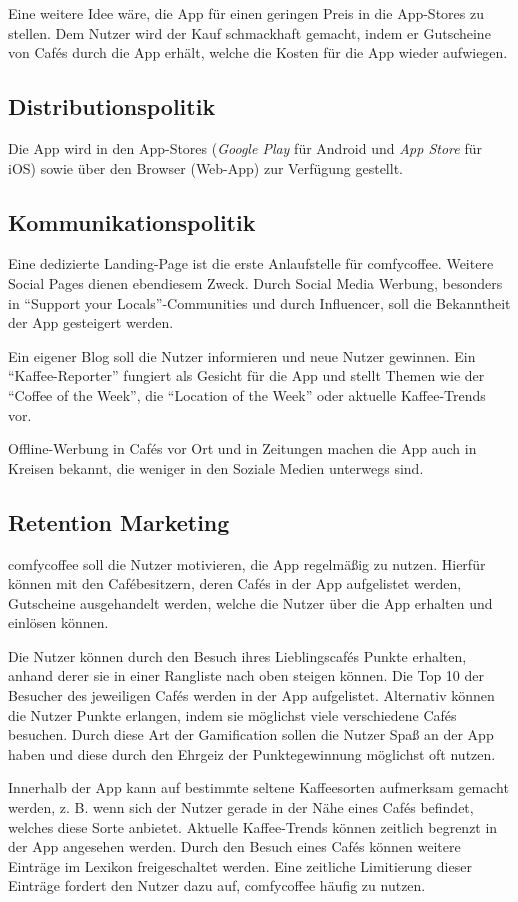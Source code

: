 Eine weitere Idee wäre, die App für einen geringen Preis in die App-Stores zu stellen. Dem Nutzer wird der Kauf schmackhaft gemacht, indem er Gutscheine von Cafés durch die App erhält, welche die Kosten für die App wieder aufwiegen.

\subsection{Distributionspolitik}
Die App wird in den App-Stores (\emph{Google Play} für Android und \emph{App Store} für iOS) sowie über den Browser (Web-App) zur Verfügung gestellt.

\subsection{Kommunikationspolitik}
Eine dedizierte Landing-Page ist die erste Anlaufstelle für comfycoffee. Weitere Social Pages dienen ebendiesem Zweck. Durch Social Media Werbung, besonders in ``Support your Locals''-Communities und durch Influencer, soll die Bekanntheit der App gesteigert werden.

Ein eigener Blog soll die Nutzer informieren und neue Nutzer gewinnen. Ein ``Kaffee-Reporter'' fungiert als Gesicht für die App und stellt Themen wie der ``Coffee of the Week'', die ``Location of the Week'' oder aktuelle Kaffee-Trends vor.

Offline-Werbung in Cafés vor Ort und in Zeitungen machen die App auch in Kreisen bekannt, die weniger in den Soziale Medien unterwegs sind.

\subsection{Retention Marketing}
comfycoffee soll die Nutzer motivieren, die App regelmäßig zu nutzen. Hierfür können mit den Cafébesitzern, deren Cafés in der App aufgelistet werden, Gutscheine ausgehandelt werden, welche die Nutzer über die App erhalten und einlösen können.

Die Nutzer können durch den Besuch ihres Lieblingscafés Punkte erhalten, anhand derer sie in einer Rangliste nach oben steigen können. Die Top 10 der Besucher des jeweiligen Cafés werden in der App aufgelistet. Alternativ können die Nutzer Punkte erlangen, indem sie möglichst viele verschiedene Cafés besuchen. Durch diese Art der Gamification sollen die Nutzer Spaß an der App haben und diese durch den Ehrgeiz der Punktegewinnung möglichst oft nutzen.

Innerhalb der App kann auf bestimmte seltene Kaffeesorten aufmerksam gemacht werden, z. B. wenn sich der Nutzer gerade in der Nähe eines Cafés befindet, welches diese Sorte anbietet. Aktuelle Kaffee-Trends können zeitlich begrenzt in der App angesehen werden. Durch den Besuch eines Cafés können weitere Einträge im Lexikon freigeschaltet werden. Eine zeitliche Limitierung dieser Einträge fordert den Nutzer dazu auf, comfycoffee häufig zu nutzen.

